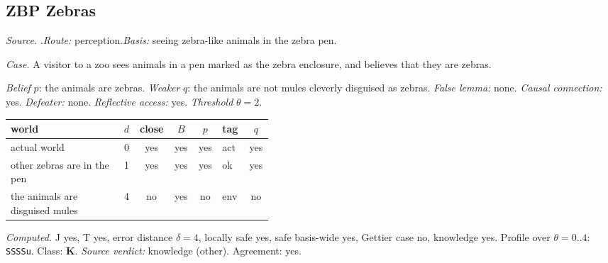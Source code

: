 \subsection*{ZBP \enspace Zebras}
\noindent\textit{Source.} \citet{Dretske1970}.\quad \textit{Route:} perception.\quad \textit{Basis:} seeing zebra-like animals in the zebra pen.\par
\noindent\textit{Case.} A visitor to a zoo sees animals in a pen marked as the zebra enclosure, and believes that they are zebras.\par
\noindent\textit{Belief} $p$: the animals are zebras.
 \textit{Weaker} $q$: the animals are not mules cleverly disguised as zebras.
 \textit{False lemma:} none. \textit{Causal connection:} yes. \textit{Defeater:} none. \textit{Reflective access:} yes. \textit{Threshold} $\theta = 2$.\par
\begin{center}\begin{tabular}{@{}p{0.43\linewidth}rccclc@{}}
world & $d$ & close & $B$ & $p$ & tag & $q$ \\ \midrule
actual world & 0 & yes & yes & yes & act & yes \\
other zebras are in the pen & 1 & yes & yes & yes & ok & yes \\
the animals are disguised mules & 4 & no & yes & no & env & no \\
\end{tabular}\end{center}
\noindent\textit{Computed.} J yes, T yes, error distance $\delta = 4$, locally safe yes, safe basis-wide yes, Gettier case no, knowledge yes. Profile over $\theta = 0..4$: \texttt{SSSSu}. Class: \textbf{K}.
 \textit{Source verdict:} knowledge (other). Agreement: yes.
\par\medskip
{}
